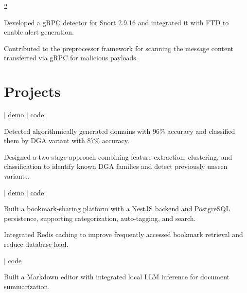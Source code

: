 \documentclass[]{hieudo-build}
\begin{document}
\begin{paracol}{2}
\begin{tightemize}
 \item Developed a gRPC detector for Snort 2.9.16 and integrated it with FTD to enable alert generation.
 \item Contributed to the preprocessor framework for scanning the message content transferred via gRPC for malicious payloads.
\end{tightemize}
\sectionsep

\section{Projects}

 $|$ \href{https://dga-detector.streamlit.app}{demo} $|$ \href{https://github.com/Vikramadtya/DGA-Detector}{code}

\begin{tightemize}
\item Detected algorithmically generated domains with 96\% accuracy and classified them by DGA variant with 87\% accuracy.
\item Designed a two-stage approach combining feature extraction, clustering, and classification to identify known DGA families and detect previously unseen variants.
\end{tightemize}
\sectionsep

 $|$ \href{https://bookmarker-theta-three.vercel.app}{demo} $|$ \href{https://github.com/Vikramadtya/Bookmarker}{code}

\begin{tightemize}
\item Built a bookmark-sharing platform with a NestJS backend and PostgreSQL persistence, supporting categorization, auto-tagging, and search.
\item Integrated Redis caching to improve frequently accessed bookmark retrieval and reduce database load.
\end{tightemize}
\sectionsep 

 $|$ \href{https://github.com/Vikramadtya/Meditor}{code}

\begin{tightemize}
\item Built a Markdown editor with integrated local LLM inference for document summarization.
\end{tightemize}
\sectionsep 


\end{paracol}
\end{document}
